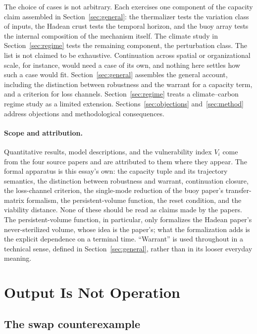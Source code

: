 \documentclass[11pt]{article}
\theoremstyle{definition}
\begin{document}
The choice of cases is not arbitrary. Each exercises one component of the capacity claim assembled in Section~\ref{sec:general}: the thermalizer tests the variation class of inputs, the Hadean crust tests the temporal horizon, and the buoy array tests the internal composition of the mechanism itself. The climate study in Section~\ref{sec:regime} tests the remaining component, the perturbation class. The list is not claimed to be exhaustive. Continuation across spatial or organizational scale, for instance, would need a case of its own, and nothing here settles how such a case would fit. Section~\ref{sec:general} assembles the general account, including the distinction between robustness and the warrant for a capacity term, and a criterion for loss channels. Section~\ref{sec:regime} treats a climate--carbon regime study as a limited extension. Sections~\ref{sec:objections} and~\ref{sec:method} address objections and methodological consequences.

\paragraph*{Scope and attribution.} Quantitative results, model descriptions, and the vulnerability index $V_i$ come from the four source papers and are attributed to them where they appear. The formal apparatus is this essay's own: the capacity tuple and its trajectory semantics, the distinction between robustness and warrant, continuation closure, the loss-channel criterion, the single-mode reduction of the buoy paper's transfer-matrix formalism, the persistent-volume function, the reset condition, and the viability distance. None of these should be read as claims made by the papers. The persistent-volume function, in particular, only formalizes the Hadean paper's never-sterilized volume, whose idea is the paper's; what the formalization adds is the explicit dependence on a terminal time. ``Warrant'' is used throughout in a technical sense, defined in Section~\ref{sec:general}, rather than in its looser everyday meaning.

\section{Output Is Not Operation}\label{sec:output}

\subsection{The swap counterexample}
\end{document}
